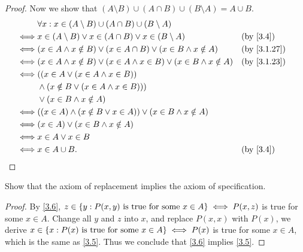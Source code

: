 \begin{proof}
  Now we show that \((A \setminus B) \cup (A \cap B) \cup (B \setminus A) = A \cup B\).
  \begin{align*}
         & \forall x : x \in (A \setminus B) \cup (A \cap B) \cup (B \setminus A)                                   \\
    \iff & x \in (A \setminus B) \lor x \in (A \cap B) \lor x \in (B \setminus A)                  &  & \by{3.4}    \\
    \iff & (x \in A \land x \notin B) \lor (x \in A \cap B) \lor (x \in B \land x \notin A)        &  & \by{3.1.27} \\
    \iff & (x \in A \land x \notin B) \lor (x \in A \land x \in B) \lor (x \in B \land x \notin A) &  & \by{3.1.23} \\
    \iff & ((x \in A \lor (x \in A \land x \in B))                                                                  \\
         & \land (x \notin B \lor (x \in A \land x \in B)))                                                         \\
         & \lor (x \in B \land x \notin A)                                                                          \\
    \iff & ((x \in A) \land (x \notin B \lor x \in A)) \lor (x \in B \land x \notin A)                              \\
    \iff & (x \in A) \lor (x \in B \land x \notin A)                                                                \\
    \iff & x \in A \lor x \in B                                                                                     \\
    \iff & x \in A \cup B.                                                                         &  & \by{3.4}
  \end{align*}
\end{proof}

\begin{ex}\label{ex:3.1.11}
  Show that the axiom of replacement implies the axiom of specification.
\end{ex}

\begin{proof}
  By \cref{3.6}, \(z \in \left\lbrace y : P(x, y) \text{ is true for some } x \in A\right\rbrace \iff P(x, z)\) is true for some \(x \in A\).
  Change all \(y\) and \(z\) into \(x\), and replace \(P(x, x)\) with \(P(x)\), we derive \(x \in \left\lbrace x : P(x) \text{ is true for some } x \in A\right\rbrace \iff P(x)\) is true for some \(x \in A\), which is the same as \cref{3.5}.
  Thus we conclude that \cref{3.6} implies \cref{3.5}.
\end{proof}
